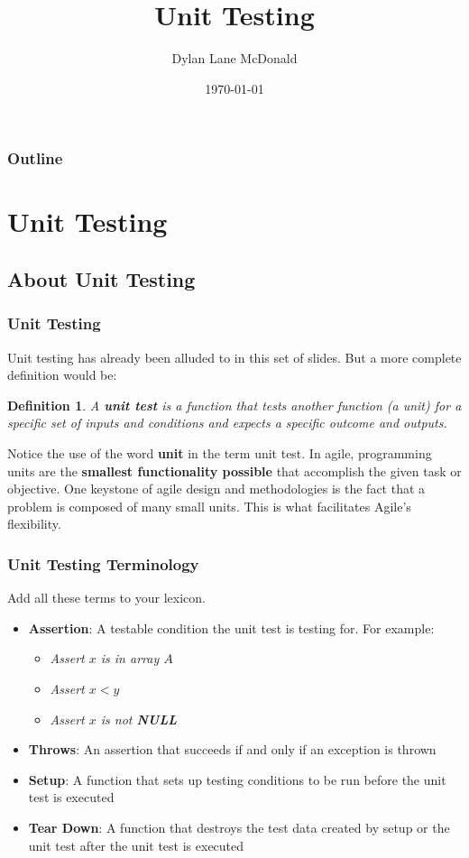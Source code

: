 \documentclass[aspectratio=169]{beamer}
\title{Unit Testing}
\author{Dylan Lane McDonald}
\institute{CNM STEMulus Center\\Web Development with PHP}
\date{\today}
\newtheorem{defn}{Definition}
\begin{document}
\lstset{language=Java}
\begin{frame}
\titlepage
\end{frame}

\begin{frame}
\frametitle{Outline}
\tableofcontents
\end{frame}

\section{Unit Testing}
\subsection{About Unit Testing}
\begin{frame}
\frametitle{Unit Testing}
Unit testing has already been alluded to in this set of slides. But a more complete definition would be:
\begin{defn}
A \textbf{unit test} is a function that tests another function (a \emph{unit}) for a specific set of inputs and conditions and expects a specific outcome and outputs.
\end{defn}

\pause
Notice the use of the word \textbf{unit} in the term unit test. In agile, programming units are the \textbf{smallest functionality possible} that accomplish the given task or objective. One keystone of agile design and methodologies is the fact that a problem is composed of many small units. This is what facilitates Agile's flexibility.
\end{frame}

\begin{frame}
\frametitle{Unit Testing Terminology}
Add all these terms to your lexicon.
\begin{itemize}
	\item \textbf{Assertion}: A testable condition the unit test is testing for. For example:
	\begin{itemize}
		\item \textit{Assert $x$ is in array $A$}
		\item \textit{Assert $x < y$}
		\item \textit{Assert $x$ is not \textbf{NULL}}
	\end{itemize}
	\item \textbf{Throws}: An assertion that succeeds if and only if an exception is thrown
	\item \textbf{Setup}: A function that sets up testing conditions to be run before the unit test is executed
	\item \textbf{Tear Down}: A function that destroys the test data created by setup or the unit test after the unit test is executed
\end{itemize}
\end{frame}
\end{document}
